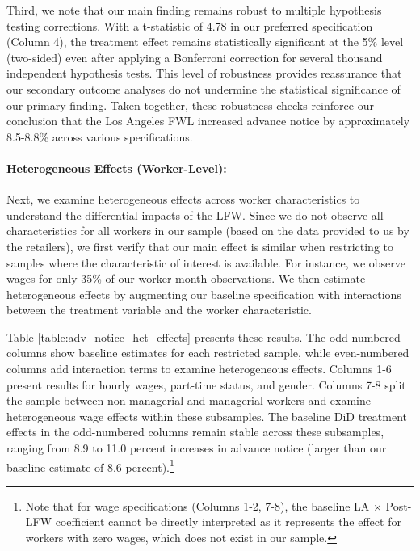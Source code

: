 \documentclass[letterpaper,11pt,leqno]{article}
\theoremstyle{paper}
\begin{document}
Third, we note that our main finding remains robust to multiple hypothesis testing corrections. With a t-statistic of 4.78 in our preferred specification (Column 4), the treatment effect remains statistically significant at the 5\% level (two-sided) even after applying a Bonferroni correction for several thousand independent hypothesis tests. This level of robustness provides reassurance that our secondary outcome analyses do not undermine the statistical significance of our primary finding. Taken together, these robustness checks reinforce our conclusion that the Los Angeles FWL increased advance notice by approximately 8.5-8.8\% across various specifications.


\paragraph{Heterogeneous Effects (Worker-Level):}
Next, we examine heterogeneous effects across worker characteristics to understand the differential impacts of the LFW. Since we do not observe all characteristics for all workers in our sample (based on the data provided to us by the retailers), we first verify that our main effect is similar when restricting to samples where the characteristic of interest is available. For instance, we observe wages for only 35\% of our worker-month observations. We then estimate heterogeneous effects by augmenting our baseline specification with interactions between the treatment variable and the worker characteristic.

Table \ref{table:adv_notice_het_effects} presents these results. The odd-numbered columns show baseline estimates for each restricted sample, while even-numbered columns add interaction terms to examine heterogeneous effects. Columns 1-6 present results for hourly wages, part-time status, and gender. Columns 7-8 split the sample between non-managerial and managerial workers and examine heterogeneous wage effects within these subsamples. The baseline DiD treatment effects in the odd-numbered columns remain stable across these subsamples, ranging from 8.9 to 11.0 percent increases in advance notice (larger than our baseline estimate of 8.6 percent).\footnote{Note that for wage specifications (Columns 1-2, 7-8), the baseline LA $\times$ Post-LFW coefficient cannot be directly interpreted as it represents the effect for workers with zero wages, which does not exist in our sample.} 
\end{document}
